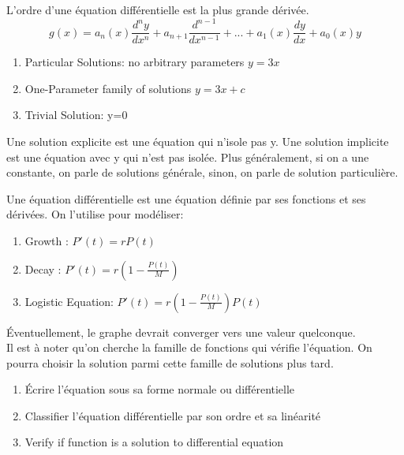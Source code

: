\documentclass{article}
\begin{document}
\begin{definition}
    L'ordre d'une équation différentielle est la plus grande dérivée.
    $$ g(x) = a_n (x) \frac{d^n y}{dx^n} + a_{n+1} \frac{d^{n-1}}
    {d x^{n-1}}  + ... + a_1(x) \frac{dy}{dx}  + a_0 (x) y $$
\end{definition}

\begin{definition}
    \begin{enumerate}
        \item Particular Solutions: no arbitrary parameters $ y = 3x$
	\item One-Parameter family of solutions $ y=3x+c$
	\item Trivial Solution: y=0
    \end{enumerate}
    Une solution explicite est une équation qui n'isole pas y. Une solution
    implicite est une équation avec y qui n'est pas isolée.
    Plus généralement, si on a une constante, on parle de solutions
    générale, sinon, on parle de solution particulière.
\end{definition}

Une équation différentielle est une équation définie par ses fonctions
et ses dérivées. On l'utilise pour modéliser:
\begin{enumerate}
    \item Growth : $ P'(t) = r P(t)$
    \item Decay : $ P'(t) = r (1- \frac{P(t)}{M})$
    \item Logistic Equation: $ P'(t) = r (1- \frac{P(t)}{M})P(t)$
\end{enumerate}

Éventuellement, le graphe devrait converger vers une valeur quelconque.\\

Il est à noter qu'on cherche la famille de fonctions qui vérifie l'équation.
 On pourra choisir la solution parmi cette famille de solutions plus tard.

 \begin{problem}
     \begin{enumerate}
         \item Écrire l'équation sous sa forme normale ou différentielle
	 \item Classifier l'équation différentielle par son ordre et
	     sa linéarité
	    \item Verify if function is a solution to differential
		equation
     \end{enumerate}
 \end{problem}
\end{document}
